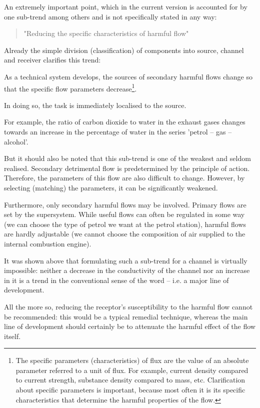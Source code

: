 \documentclass[a4paper,11pt]{article}
\begin{document}
An extremely important point, which in the current version is accounted for by
one sub-trend among others and is not specifically stated in any way:
\begin{quote}
  "Reducing the specific characteristics of harmful flow"
\end{quote}
Already the simple division (classification) of components into source,
channel and receiver clarifies this trend:

As a technical system develops, the sources of secondary harmful flows change
so that the specific flow parameters decrease\footnote{The specific parameters
  (characteristics) of flux are the value of an absolute parameter referred to
  a unit of flux. For example, current density compared to current strength,
  substance density compared to mass, etc. Clarification about specific
  parameters is important, because most often it is its specific
  characteristics that determine the harmful properties of the flow.}.

In doing so, the task is immediately localised to the source.

For example, the ratio of carbon dioxide to water in the exhaust gases changes
towards an increase in the percentage of water in the series 'petrol -- gas --
alcohol'.

But it should also be noted that this sub-trend is one of the weakest and
seldom realised. Secondary detrimental flow is predetermined by the principle
of action. Therefore, the parameters of this flow are also difficult to
change. However, by selecting (matching) the parameters, it can be
significantly weakened.

Furthermore, only secondary harmful flows may be involved. Primary flows are
set by the supersystem. While useful flows can often be regulated in some way
(we can choose the type of petrol we want at the petrol station), harmful
flows are hardly adjustable (we cannot choose the composition of air supplied
to the internal combustion engine).

It was shown above that formulating such a sub-trend for a channel is
virtually impossible: neither a decrease in the conductivity of the channel
nor an increase in it is a trend in the conventional sense of the word --
i.e. a major line of development.

All the more so, reducing the receptor's susceptibility to the harmful flow
cannot be recommended: this would be a typical remedial technique, whereas the
main line of development should certainly be to attenuate the harmful effect
of the flow itself.
\end{document}
